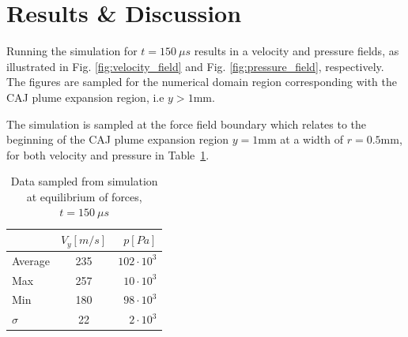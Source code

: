\documentclass[a4paper]{iacas}%
\begin{document}
\section{Results \& Discussion}

Running the simulation for $ t = 150~\mu s $ results in a velocity and pressure fields, as illustrated in Fig. \ref{fig:velocity_field} and Fig. \ref{fig:pressure_field}, respectively. The figures are sampled for the numerical domain region corresponding with the CAJ plume expansion region, i.e $ y > 1 \mathrm{mm} $.

The simulation is sampled at the force field boundary which relates to the beginning of the CAJ plume expansion region $ y = 1 \mathrm{mm} $ at a width of $  r = 0.5 \mathrm{mm}  $, for both velocity and pressure in Table~\ref{t:velocities}.

\begin{table}[hbt]
	\begin{center}
		\begin{threeparttable}
			\caption{Data sampled from simulation at equilibrium of forces, $ t = 150~\mu s$}
			\label{t:velocities}
			\begin{tabular}{lcr}
				& 
				$ V_y [m/s] $ &
				$ p [Pa] $ \\\hline
			Average 	& 235 &	$ 102 \cdot 10^3  $ \\
			Max 		& 	257	& $ 10\cdot 10^3 $ \\
			Min 		& 	180	& $ 98\cdot 10^3 $ \\
			$ \sigma $	& 	22	& $ 2\cdot 10^3 $
			\end{tabular}
		\end{threeparttable}
	\end{center}
\end{table}
\end{document}
